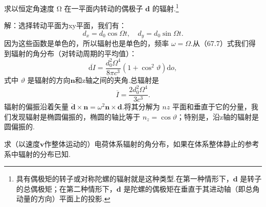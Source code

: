 \begin{xiti}

\quad 求以恒定角速度 Ω 在一平面内转动的偶极子 $\boldsymbol{d}$ 的辐射.\footnote{具有偶极矩的转子或对称陀螺的辐射就是这种类型.在第一种情形下，$\boldsymbol{d}$ 是转子的总偶极矩；在第二种情形下，$\boldsymbol{d}$ 是陀螺的偶极矩在垂直于其进动轴（即总角动量的方向）平面上的投影.}

解：选择转动平面为xy平面，我们有：
\begin{equation*}
  d_x=d_0\cos\varOmega t,\quad d_y=d_0\sin\varOmega t.
\end{equation*}
因为这些函数是单色的，所以辐射也是单色的，频率 $\omega=\varOmega$.从（67.7）式我们得到辐射的角分布（对转动周期的平均值）：
\begin{equation*}
  \overline{\mathrm{d}I}=\frac{d_0^2\varOmega^4}{8\pi c^3}\left(1+\cos^2\vartheta\right)\mathrm{d}o,
\end{equation*}
式中 $\vartheta$ 是辐射的方向$\boldsymbol{n}$和z轴之间的夹角.总辐射是
\begin{equation*}
  \overline{I}=\frac{2d_0^2\varOmega^4}{3c^3}.
\end{equation*}
辐射的偏振沿着矢量 $\ddot{\boldsymbol{d}}\times\boldsymbol{n}=\omega^2\boldsymbol{n}\times\boldsymbol{d}$.将其分解为 $nz$ 平面和垂直于它的分量，我们发现辐射是椭圆偏振的，椭圆的轴比等于 $n_z=\cos\vartheta$；特别是，沿z轴的辐射是圆偏振的.

\quad 求（以速度$\boldsymbol{v}$作整体运动的）电荷体系辐射的角分布，如果在体系整体静止的参考系中辐射的分布已知.


\end{xiti}

